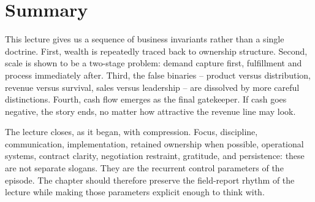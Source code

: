 \section{Summary}

This lecture gives us a sequence of business invariants rather than a single doctrine. First, wealth is repeatedly traced back to ownership structure. Second, scale is shown to be a two-stage problem: demand capture first, fulfillment and process immediately after. Third, the false binaries -- product versus distribution, revenue versus survival, sales versus leadership -- are dissolved by more careful distinctions. Fourth, cash flow emerges as the final gatekeeper. If cash goes negative, the story ends, no matter how attractive the revenue line may look.

The lecture closes, as it began, with compression. Focus, discipline, communication, implementation, retained ownership when possible, operational systems, contract clarity, negotiation restraint, gratitude, and persistence: these are not separate slogans. They are the recurrent control parameters of the episode. The chapter should therefore preserve the field-report rhythm of the lecture while making those parameters explicit enough to think with.